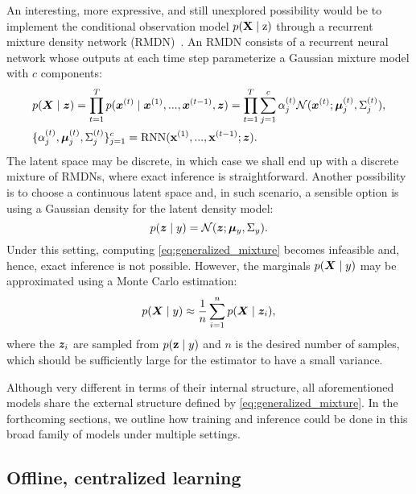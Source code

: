 An interesting, more expressive, and still unexplored possibility would be to implement the conditional observation model $p({\mathbf{X}} \mid {\textnormal{z}})$ through a recurrent mixture density network (RMDN)~\cite{Bishop1994, Graves2013, Bazzani2016}. An RMDN consists of a recurrent neural network whose outputs at each time step parameterize a Gaussian mixture model with $c$ components:
\begin{align}
    & p({\bm{X}} \mid {\bm{z}}) = \prod_{t=1}^T p({\bm{x}}^{(t)} \mid {\bm{x}}^{(1)}, ..., {\bm{x}}^{(t-1)}, {\bm{z}}) = \prod_{t=1}^T \sum_{j=1}^c \alpha_j^{(t)} \mathcal{N}({\bm{x}}^{(t)} ; {\bm{\mu}}_j^{(t)}, \Sigma_j^{(t)}),\\
    & \lbrace \alpha_j^{(t)}, {\bm{\mu}}_j^{(t)}, \Sigma_j^{(t)} \rbrace_{j=1}^c = \text{RNN}({\mathbf{x}}^{(1)}, ..., {\mathbf{x}}^{(t-1)}; {\bm{z}}).
\end{align}
The latent space may be discrete, in which case we shall end up with a discrete mixture of RMDNs, where exact inference is straightforward. Another possibility is to choose a continuous latent space and, in such scenario, a sensible option is using a Gaussian density for the latent density model:
\begin{equation}
    p({\bm{z}} \mid y) = \mathcal{N}({\bm{z}} ; {\bm{\mu}}_y, \Sigma_y).
\end{equation}
Under this setting, computing \eqref{eq:generalized_mixture} becomes infeasible and, hence, exact inference is not possible. However, the marginals $p({\bm{X}} \mid y)$ may be approximated using a Monte Carlo estimation:
\begin{equation}
    p({\bm{X}} \mid y) \approx \frac{1}{n}\sum_{i=1}^n p({\bm{X}} \mid {\bm{z}}_i),
\end{equation}
where the ${\bm{z}}_i$ are sampled from $p({\mathbf{z}} \mid y)$ and $n$ is the desired number of samples, which should be sufficiently large for the estimator to have a small variance.

Although very different in terms of their internal structure, all aforementioned models share the external structure defined by \eqref{eq:generalized_mixture}. In the forthcoming sections, we outline how training and inference could be done in this broad family of models under multiple settings.

\subsection{Offline, centralized learning}
\label{sec:offline_learning}

